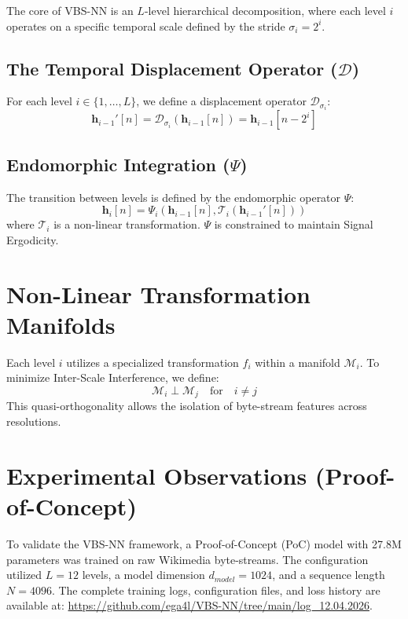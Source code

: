 \documentclass[11pt,a4paper]{article}
\begin{document}
The core of VBS-NN is an $L$-level hierarchical decomposition, where each level $i$ operates on a specific temporal scale defined by the stride $\sigma_i = 2^i$.

\subsection{The Temporal Displacement Operator ($\mathcal{D}$)}
For each level $i \in \{1, \dots, L\}$, we define a displacement operator $\mathcal{D}_{\sigma_i}$:
\begin{equation}
\mathbf{h}_{i-1}'[n] = \mathcal{D}_{\sigma_i}(\mathbf{h}_{i-1}[n]) = \mathbf{h}_{i-1}[n - 2^i]
\end{equation}

\subsection{Endomorphic Integration ($\Psi$)}
The transition between levels is defined by the endomorphic operator $\Psi$:
\begin{equation}
\mathbf{h}_i[n] = \Psi_i \left( \mathbf{h}_{i-1}[n], \mathcal{T}_i(\mathbf{h}_{i-1}'[n]) \right)
\end{equation}
where $\mathcal{T}_i$ is a non-linear transformation. $\Psi$ is constrained to maintain Signal Ergodicity.

\section{Non-Linear Transformation Manifolds}
Each level $i$ utilizes a specialized transformation $f_i$ within a manifold $\mathcal{M}_i$. To minimize Inter-Scale Interference, we define:
\begin{equation}
\mathcal{M}_i \perp \mathcal{M}_j \quad \text{for} \quad i \neq j
\end{equation}
This quasi-orthogonality allows the isolation of byte-stream features across resolutions.

\section{Experimental Observations (Proof-of-Concept)}
To validate the VBS-NN framework, a Proof-of-Concept (PoC) model with 27.8M parameters was trained on raw Wikimedia byte-streams. The configuration utilized $L=12$ levels, a model dimension $d_{model}=1024$, and a sequence length $N=4096$. The complete training logs, configuration files, and loss history are available at: 
\url{https://github.com/ega4l/VBS-NN/tree/main/log_12.04.2026}.
\end{document}

